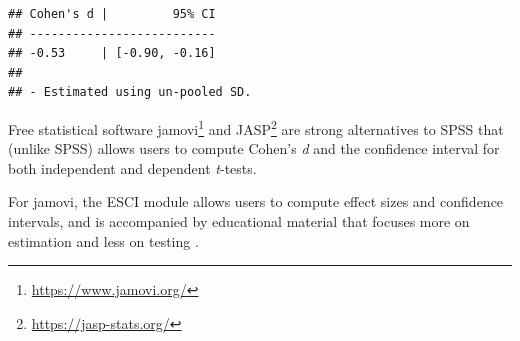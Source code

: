 \documentclass[
  oneside]{krantz}
\renewcommand{\href}[2]{#2\footnote{\url{#1}}}
\begin{document}
\begin{verbatim}
## Cohen's d |         95% CI
## --------------------------
## -0.53     | [-0.90, -0.16]
## 
## - Estimated using un-pooled SD.
\end{verbatim}

Free statistical software \href{https://www.jamovi.org/}{jamovi} and \href{https://jasp-stats.org/}{JASP} are strong alternatives to SPSS that (unlike SPSS) allows users to compute Cohen's \emph{d} and the confidence interval for both independent and dependent \emph{t}-tests.

For jamovi, the ESCI module allows users to compute effect sizes and confidence intervals, and is accompanied by educational material that focuses more on estimation and less on testing \citep{cumming_introduction_2016}.
\end{document}
